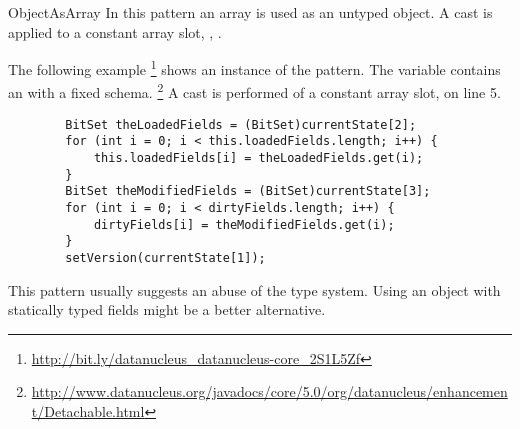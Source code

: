 \begin{pattern}{ObjectAsArray}
In this pattern an array is used as an untyped object.
A cast is applied to a constant array slot, \eg, .

\instances{}
The following example%
\footnote{\url{http://bit.ly/datanucleus_datanucleus-core_2S1L5Zf}}
shows an instance of the \thisp{} pattern.
The variable  contains an  with a fixed
schema.%
\footnote{\url{http://www.datanucleus.org/javadocs/core/5.0/org/datanucleus/enhancement/Detachable.html}}
A cast is performed of a constant array slot,  on line 5.

\begin{verbatim}
        BitSet theLoadedFields = (BitSet)currentState[2];
        for (int i = 0; i < this.loadedFields.length; i++) {
            this.loadedFields[i] = theLoadedFields.get(i);
        }
        BitSet theModifiedFields = (BitSet)currentState[3];
        for (int i = 0; i < dirtyFields.length; i++) {
            dirtyFields[i] = theModifiedFields.get(i);
        }
        setVersion(currentState[1]);
\end{verbatim}

\discussion{}
This pattern usually suggests an abuse of the type system.
Using an object with statically typed fields might be a better alternative.

\end{pattern}
